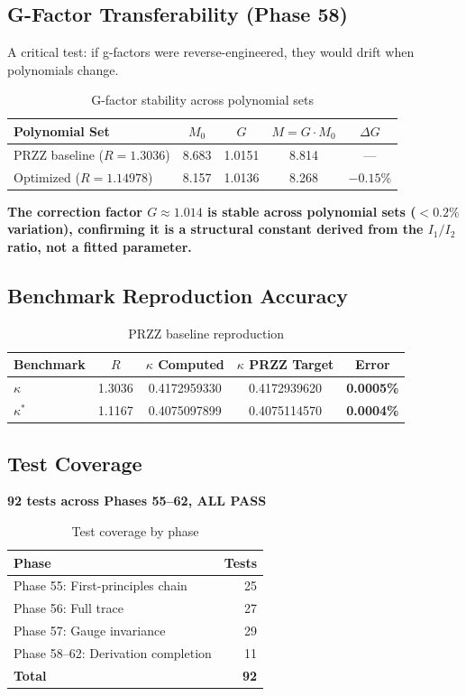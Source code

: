 \documentclass[11pt]{article}
\begin{document}
\subsection{G-Factor Transferability (Phase 58)}

A critical test: if g-factors were reverse-engineered, they would drift when polynomials change.

\begin{table}[h]
\centering
\caption{G-factor stability across polynomial sets}
\begin{tabular}{lcccc}
\toprule
Polynomial Set & $M_0$ & $G$ & $M = G \cdot M_0$ & $\Delta G$ \\
\midrule
PRZZ baseline ($R=1.3036$) & 8.683 & 1.0151 & 8.814 & --- \\
Optimized ($R=1.14978$) & 8.157 & 1.0136 & 8.268 & $-0.15\%$ \\
\bottomrule
\end{tabular}
\end{table}

\textbf{The correction factor $G \approx 1.014$ is stable across polynomial sets ($<0.2\%$ variation), confirming it is a structural constant derived from the $I_1/I_2$ ratio, not a fitted parameter.}

\subsection{Benchmark Reproduction Accuracy}

\begin{table}[h]
\centering
\caption{PRZZ baseline reproduction}
\begin{tabular}{lcccc}
\toprule
Benchmark & $R$ & $\kappa$ Computed & $\kappa$ PRZZ Target & Error \\
\midrule
$\kappa$ & 1.3036 & 0.4172959330 & 0.4172939620 & \textbf{0.0005\%} \\
$\kappa^*$ & 1.1167 & 0.4075097899 & 0.4075114570 & \textbf{0.0004\%} \\
\bottomrule
\end{tabular}
\end{table}

\subsection{Test Coverage}

\textbf{92 tests across Phases 55--62, ALL PASS}

\begin{table}[h]
\centering
\caption{Test coverage by phase}
\begin{tabular}{lr}
\toprule
Phase & Tests \\
\midrule
Phase 55: First-principles chain & 25 \\
Phase 56: Full trace & 27 \\
Phase 57: Gauge invariance & 29 \\
Phase 58--62: Derivation completion & 11 \\
\midrule
\textbf{Total} & \textbf{92} \\
\bottomrule
\end{tabular}
\end{table}
\end{document}
